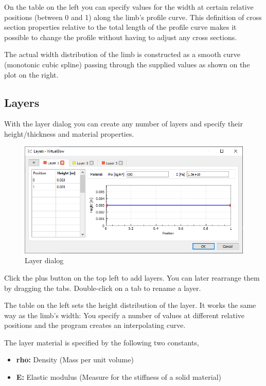 \documentclass[12pt]{article}
\begin{document}
On the table on the left you can specify values for the width at certain relative positions (between 0 and 1) along the limb's profile curve. This definition of cross section properties relative to the total length of the profile curve makes it possible to change the profile without having to adjust any cross sections.

The actual width distribution of the limb is constructed as a smooth curve (monotonic cubic spline) passing through the supplied values as shown on the plot on the right.

\newpage
\subsection{Layers}

With the layer dialog you can create any number of layers and specify their height/thickness and material properties.

\begin{figure}[H]
\centering
\includegraphics[width=\textwidth]{figures/screenshots/input/layers}
\caption{Layer dialog}
\label{fig:width}
\end{figure}

Click the plus button on the top left to add layers. You can later rearrange them by dragging the tabs. Double-click on a tab to rename a layer.

The table on the left sets the height distribution of the layer. It works the same way as the limb's width: You specify a number of values at different relative positions and the program creates an interpolating curve.

The layer material is specified by the following two constants,

\begin{itemize}
\item \textbf{rho:} Density (Mass per unit volume)
\item \textbf{E:} Elastic modulus (Measure for the stiffness of a solid material)
\end{itemize}
\end{document}

